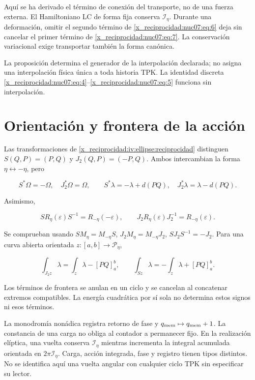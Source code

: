 Aquí se ha derivado el término de conexión del transporte, no de una fuerza externa. El Hamiltoniano LC de forma fija conserva \(\mathcal I_\eta\). Durante una deformación, omitir el segundo término de \eqref{x_reciprocidad:nuc07:eq:6} deja sin cancelar el primer término de \eqref{x_reciprocidad:nuc07:eq:7}. La conservación variacional exige transportar también la forma canónica.

La proposición determina el generador de la interpolación declarada; no asigna una interpolación física única a toda historia TPK. La identidad discreta \eqref{x_reciprocidad:nuc07:eq:4}–\eqref{x_reciprocidad:nuc07:eq:5} funciona sin interpolación.

\section{Orientación y frontera de la acción}

Las transformaciones de \cref{x_reciprocidad:iv:ellipse:reciprocidad} distinguen \(S(Q,P)=(P,Q)\) y \(J_2(Q,P)=(-P,Q)\). Ambos intercambian la forma \(\eta\leftrightarrow-\eta\), pero

\begin{equation}
S^*\Omega=-\Omega,\quad J_2^*\Omega=\Omega,\qquad
S^*\lambda=-\lambda+d(PQ),\quad
J_2^*\lambda=\lambda-d(PQ).
\label{x_reciprocidad:nuc07:eq:9}
\end{equation}

Asimismo,

\begin{equation}
S R_\eta(\varepsilon)S^{-1}=R_{-\eta}(-\varepsilon),\qquad
J_2R_\eta(\varepsilon)J_2^{-1}=R_{-\eta}(\varepsilon).
\label{x_reciprocidad:nuc07:eq:10}
\end{equation}

Se comprueban usando \(SM_\eta=M_{-\eta}S\), \(J_2M_\eta=M_{-\eta}J_2\), \(SJ_2S^{-1}=-J_2\). Para una curva abierta orientada \(z:[a,b]\to\mathcal P_\eta\),

\begin{equation}
\int_{J_2z}\lambda=\int_z\lambda-[PQ]_a^b,\qquad
\int_{Sz}\lambda=-\int_z\lambda+[PQ]_a^b.
\label{x_reciprocidad:nuc07:eq:11}
\end{equation}

Los términos de frontera se anulan en un ciclo y se cancelan al concatenar extremos compatibles. La energía cuadrática por sí sola no determina estos signos ni esos términos.

La monodromía nonádica registra retorno de fase y \(q_{\rm mem}\mapsto q_{\rm mem}+1\). La constancia de una carga no obliga al contador a permanecer fijo. En la realización elíptica, una vuelta conserva \(\mathcal I_\eta\) mientras incrementa la integral acumulada orientada en \(2\pi\mathcal I_\eta\). Carga, acción integrada, fase y registro tienen tipos distintos. No se identifica aquí una vuelta angular con cualquier ciclo TPK sin especificar su lector.

